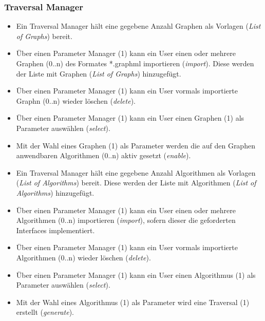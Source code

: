 \subsubsection{Traversal Manager}
\label{subsubsec:Traversal Manager}
\begin{itemize}
  \item Ein Traversal Manager h\"alt eine gegebene Anzahl Graphen als Vorlagen (\textit{List of Graphs}) bereit.
  \item \"Uber einen Parameter Manager (1) kann ein User einen oder mehrere Graphen (0..n) des Formates *.graphml importieren (\textit{import}). Diese werden der Liste mit Graphen (\textit{List of Graphs}) hinzugef\"ugt.
  \item \"Uber einen Parameter Manager (1) kann ein User vormals importierte Graphn (0..n) wieder l\"oschen (\textit{delete}).
  \item \"Uber einen Parameter Manager (1) kann ein User einen Graphen (1) als Parameter ausw\"ahlen (\textit{select}).
  \item Mit der Wahl eines Graphen (1) als Parameter werden die auf den Graphen anwendbaren Algorithmen (0..n) aktiv gesetzt (\textit{enable}).
  \item Ein Traversal Manager h\"alt eine gegebene Anzahl Algorithmen als Vorlagen (\textit{List of Algorithms}) bereit. Diese werden der Liste mit Algorithmen (\textit{List of Algorithms}) hinzugef\"ugt.
  \item \"Uber einen Parameter Manager (1) kann ein User einen oder mehrere Algorithmen (0..n) importieren (\textit{import}), sofern dieser die geforderten Interfaces implementiert.
  \item \"Uber einen Parameter Manager (1) kann ein User vormals importierte Algorithmen (0..n) wieder l\"oschen (\textit{delete}).
  \item \"Uber einen Parameter Manager (1) kann ein User einen Algorithmus (1) als Parameter ausw\"ahlen (\textit{select}).
  \item Mit der Wahl eines Algorithmus (1) als Parameter wird eine Traversal (1) erstellt (\textit{generate}).
\end{itemize}
% 
